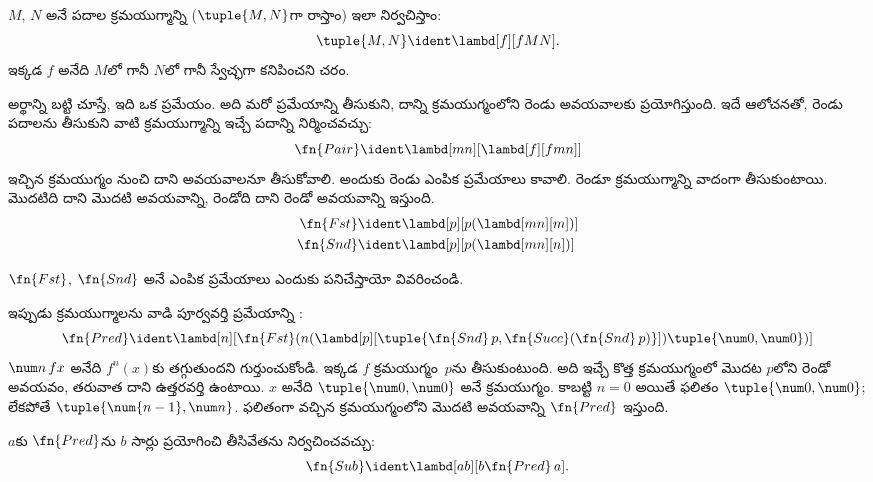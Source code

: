 \documentclass[../../../include/open-logic-section]{subfiles}
\begin{document}

\begin{defn}
$M$, $N$ అనే పదాల క్రమయుగ్మాన్ని ($\tuple{M,N}$గా రాస్తాం) ఇలా
నిర్వచిస్తాం:
\[
\tuple{M,N} \ident \lambd[f][fMN].
\]
ఇక్కడ $f$ అనేది $M$లో గానీ $N$లో గానీ స్వేచ్ఛగా కనిపించని చరం.
\end{defn}

అర్థాన్ని బట్టి చూస్తే, ఇది ఒక ప్రమేయం. అది మరో ప్రమేయాన్ని
తీసుకుని, దాన్ని క్రమయుగ్మంలోని రెండు అవయవాలకు ప్రయోగిస్తుంది.
ఇదే ఆలోచనతో, రెండు పదాలను తీసుకుని వాటి క్రమయుగ్మాన్ని
ఇచ్చే పదాన్ని నిర్మించవచ్చు:
\[
  \fn{Pair} \ident \lambd[mn][\lambd[f][fmn]]
\]
ఇచ్చిన క్రమయుగ్మం నుంచి దాని అవయవాలనూ తీసుకోవాలి.
అందుకు రెండు ఎంపిక ప్రమేయాలు కావాలి. రెండూ క్రమయుగ్మాన్ని
వాదంగా తీసుకుంటాయి. మొదటిది దాని మొదటి అవయవాన్ని, రెండోది దాని
రెండో అవయవాన్ని ఇస్తుంది.
\begin{align*}
  \fn{Fst} & \ident \lambd[p][p(\lambd[mn][m])]\\
  \fn{Snd} & \ident \lambd[p][p(\lambd[mn][n])]
\end{align*}

\begin{prob}
  $\fn{Fst}$, $\fn{Snd}$ అనే ఎంపిక ప్రమేయాలు ఎందుకు
  పనిచేస్తాయో వివరించండి.
\end{prob}

ఇప్పుడు క్రమయుగ్మాలను వాడి పూర్వవర్తి ప్రమేయాన్ని
:
\[
  \fn{Pred} \ident \lambd[n][\fn{Fst}(n (\lambd[p][\tuple{\fn{Snd}\, {p}, \fn{Succ}(\fn{Snd}\, {p})}]) \tuple{\num 0, \num 0})]
\]
$\num n\, f x$ అనేది $f^{n}(x)$కు తగ్గుతుందని గుర్తుంచుకోండి.
ఇక్కడ $f$ క్రమయుగ్మం~$p$ను తీసుకుంటుంది. అది ఇచ్చే కొత్త
క్రమయుగ్మంలో మొదట $p$లోని రెండో అవయవం, తరువాత దాని ఉత్తరవర్తి ఉంటాయి.
$x$ అనేది $\tuple{\num 0,\num 0}$ అనే క్రమయుగ్మం. కాబట్టి $n=0$ అయితే
ఫలితం $\tuple{\num 0,\num 0}$; లేకపోతే
$\tuple{\num{n-1}, \num n}$. ఫలితంగా వచ్చిన క్రమయుగ్మంలోని మొదటి
అవయవాన్ని $\fn{Pred}$ ఇస్తుంది.

$a$కు $\fn{Pred}$ను $b$ సార్లు ప్రయోగించి తీసివేతను
నిర్వచించవచ్చు:
\[
\fn{Sub} \ident \lambd[ab][b \fn{Pred}\, a].
\]
\end{document}
